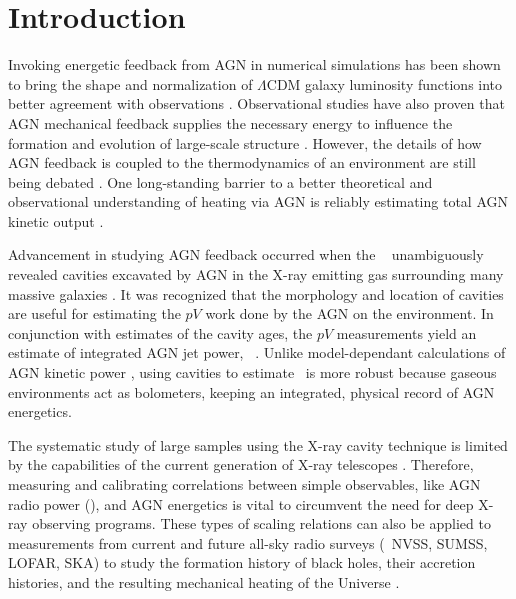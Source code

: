 \documentclass{emulateapj}
\begin{document}


\section{Introduction}
\label{sec:intro}

Invoking energetic feedback from AGN in numerical simulations has been
shown to bring the shape and normalization of $\Lambda$CDM galaxy
luminosity functions into better agreement with observations
\citep{croton06, bower06, saro06, sijacki07}. Observational studies
have also proven that AGN mechanical feedback supplies the necessary
energy to influence the formation and evolution of large-scale
structure \citep{birzan04, 2005MNRAS.364.1343D, rafferty06, dunn08,
  birzan08}. However, the details of how AGN feedback is coupled to
the thermodynamics of an environment are still being debated
\citep{2008ASPC..386..343D, 2009arXiv0910.3691M}. One long-standing
barrier to a better theoretical and observational understanding of
heating via AGN is reliably estimating total AGN kinetic output
\citep[\eg][]{1991Natur.349..138R, 1996AJ....112....9L}.

Advancement in studying AGN feedback occurred when the
\cxo\ \citep{chandra} unambiguously revealed cavities excavated by AGN
in the X-ray emitting gas surrounding many massive galaxies
\citep[\eg][]{2000ApJ...534L.135M, perseus1, schindler01}. It was
recognized that the morphology and location of cavities are useful for
estimating the $pV$ work done by the AGN on the environment. In
conjunction with estimates of the cavity ages, the $pV$ measurements
yield an estimate of integrated AGN jet power, \pjet\ \citep[see][for
  a review]{mcnamrev}. Unlike model-dependant calculations of AGN
kinetic power \citep[\eg][]{1999MNRAS.309.1017W}, using cavities to
estimate \pjet\ is more robust because gaseous environments act as
bolometers, keeping an integrated, physical record of AGN energetics.

The systematic study of large samples using the X-ray cavity technique
is limited by the capabilities of the current generation of X-ray
telescopes \citep{2009arXiv0909.0397B}. Therefore, measuring and
calibrating correlations between simple observables, like AGN radio
power (\prad), and AGN energetics is vital to circumvent the need for
deep X-ray observing programs. These types of scaling relations can
also be applied to measurements from current and future all-sky radio
surveys (\eg\ NVSS, SUMSS, LOFAR, SKA) to study the formation history
of black holes, their accretion histories, and the resulting
mechanical heating of the Universe \citep{croton06,
  2006MNRAS.366..397S}.
\end{document}
